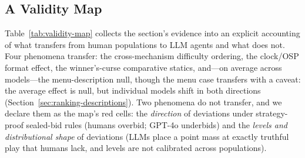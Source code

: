 \subsection{A Validity Map}\label{sec:validation-map}

Table~\ref{tab:validity-map} collects the section's evidence into an explicit accounting of what transfers from human populations to LLM agents and what does not. Four phenomena transfer: the cross-mechanism difficulty ordering, the clock/OSP format effect, the winner's-curse comparative statics, and---on average across models---the menu-description null, though the menu case transfers with a caveat: the average effect is null, but individual models shift in both directions (Section~\ref{sec:ranking-descriptions}). Two phenomena do not transfer, and we declare them as the map's red cells: the \emph{direction} of deviations under strategy-proof sealed-bid rules (humans overbid; GPT-4o underbids) and the \emph{levels and distributional shape} of deviations (LLMs place a point mass at exactly truthful play that humans lack, and levels are not calibrated across populations).

